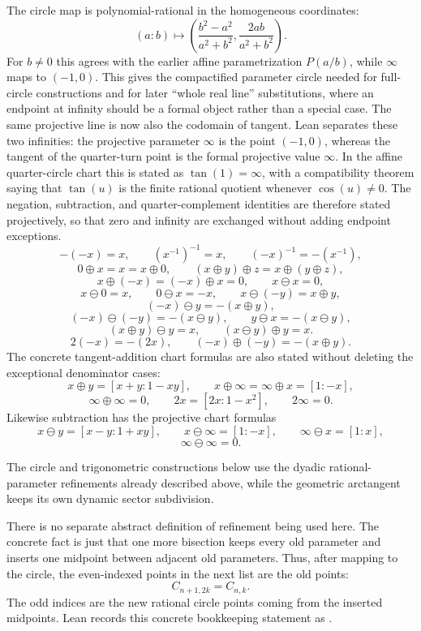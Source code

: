 \begin{remark}
The circle map is polynomial-rational in the homogeneous coordinates:
\[
  (a:b)\longmapsto
  \left(
    \frac{b^2-a^2}{a^2+b^2},
    \frac{2ab}{a^2+b^2}
  \right).
\]
For \(b\ne0\) this agrees with the earlier affine parametrization
\(P(a/b)\), while \(\infty\) maps to \((-1,0)\).  This gives the compactified
parameter circle needed for full-circle constructions and for later
``whole real line'' substitutions, where an endpoint at infinity should be a
formal object rather than a special case.  The same projective line is now
also the codomain of tangent.  Lean separates these two infinities: the
projective parameter \(\infty\) is the point \((-1,0)\), whereas the tangent of
the quarter-turn point is the formal projective value \(\infty\).  In the
affine quarter-circle chart this is stated as \(\tan(1)=\infty\), with a
compatibility theorem saying that \(\tan(u)\) is the finite rational quotient
whenever \(\cos(u)\ne0\).  The negation, subtraction, and
quarter-complement identities are therefore stated projectively, so that zero
and infinity are exchanged without adding endpoint exceptions.
\[
  -(-x)=x,\qquad (x^{-1})^{-1}=x,\qquad (-x)^{-1}=-(x^{-1}),
\]
\[
  0\oplus x=x=x\oplus0,\qquad
  (x\oplus y)\oplus z=x\oplus(y\oplus z),
\]
\[
  x\oplus(-x)=(-x)\oplus x=0,\qquad x\ominus x=0,
\]
\[
  x\ominus0=x,\qquad 0\ominus x=-x,\qquad
  x\ominus(-y)=x\oplus y,
\]
\[
  (-x)\ominus y=-(x\oplus y),
\]
\[
  (-x)\ominus(-y)=-(x\ominus y),\qquad
  y\ominus x=-(x\ominus y),
\]
\[
  (x\oplus y)\ominus y=x,\qquad
  (x\ominus y)\oplus y=x.
\]
\[
  2(-x)=-(2x),\qquad
  (-x)\oplus(-y)=-(x\oplus y).
\]
The concrete tangent-addition chart formulas are also stated without deleting
the exceptional denominator cases:
\[
  x\oplus y=[x+y:1-xy],\qquad
  x\oplus\infty=\infty\oplus x=[1:-x],
\]
\[
  \infty\oplus\infty=0,\qquad
  2x=[2x:1-x^2],\qquad 2\infty=0.
\]
Likewise subtraction has the projective chart formulas
\[
  x\ominus y=[x-y:1+xy],\qquad
  x\ominus\infty=[1:-x],\qquad
  \infty\ominus x=[1:x],
\]
\[
  \infty\ominus\infty=0.
\]

The circle and trigonometric constructions below use the dyadic
rational-parameter refinements already described above, while the geometric
arctangent keeps its own dynamic sector subdivision.
\end{remark}

\begin{remark}
\label{rem:dyadic-rational-circle-refinement}
There is no separate abstract definition of refinement being used here.  The
concrete fact is just that one more bisection keeps every old parameter and
inserts one midpoint between adjacent old parameters.  Thus, after mapping to
the circle, the even-indexed points in the next list are the old points:
\[
  C_{n+1,2k}=C_{n,k}.
\]
The odd indices are the new rational circle points coming from the inserted
midpoints.  Lean records this concrete bookkeeping statement as
.
\end{remark}

